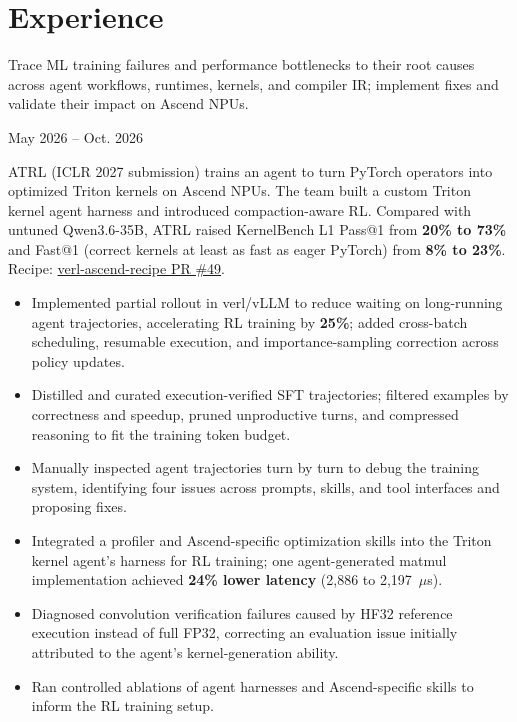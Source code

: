 \documentclass[11pt,a4paper,sans]{moderncv}
\newcommand{\atrlprojectdates}{May 2026 -- Oct. 2026}
\newcommand{\projectheading}[2]{%
  \par\addvspace{2.5pt}\noindent{\small\bfseries #1}\hfill{\small\color{color2}#2}\par\nobreak\vspace{2pt}}
\newenvironment{projectgroup}{%
  \begin{list}{}{\setlength{\leftmargin}{4mm}\setlength{\rightmargin}{0pt}%
    \setlength{\topsep}{0pt}\setlength{\partopsep}{0pt}%
    \setlength{\parsep}{0pt}\setlength{\itemsep}{0pt}}\item[]
}{\end{list}}
\newenvironment{resumeitems}{%
  \begin{itemize}\setlength{\itemsep}{2pt}\setlength{\parsep}{0pt}%
}{\end{itemize}}
\begin{document}
\makecvtitle
\vspace{-1.3cm}

\section{Experience}
Trace ML training failures and performance bottlenecks to their root causes across agent workflows, runtimes, kernels, and compiler IR; implement fixes and validate their impact on Ascend NPUs.

\begin{projectgroup}
\projectheading{Post-Training for a Triton Kernel Agent}{\atrlprojectdates}
ATRL (ICLR 2027 submission) trains an agent to turn PyTorch operators into optimized Triton kernels on Ascend NPUs. The team built a custom Triton kernel agent harness and introduced compaction-aware RL. Compared with untuned Qwen3.6-35B, ATRL raised KernelBench L1 Pass@1 from \textbf{20\% to 73\%} and Fast@1 (correct kernels at least as fast as eager PyTorch) from \textbf{8\% to 23\%}. Recipe: \href{https://github.com/verl-project/verl-ascend-recipe/pull/49}{verl-ascend-recipe PR \#49}.
\begin{resumeitems}
  \item Implemented partial rollout in verl/vLLM to reduce waiting on long-running agent trajectories, accelerating RL training by \textbf{25\%}; added cross-batch scheduling, resumable execution, and importance-sampling correction across policy updates.
  \item Distilled and curated execution-verified SFT trajectories; filtered examples by correctness and speedup, pruned unproductive turns, and compressed reasoning to fit the training token budget.
  \item Manually inspected agent trajectories turn by turn to debug the training system, identifying four issues across prompts, skills, and tool interfaces and proposing fixes.
  \item Integrated a profiler and Ascend-specific optimization skills into the Triton kernel agent's harness for RL training; one agent-generated matmul implementation achieved \textbf{24\% lower latency} (2,886 to 2,197~$\mu$s).
  \item Diagnosed convolution verification failures caused by HF32 reference execution instead of full FP32, correcting an evaluation issue initially attributed to the agent's kernel-generation ability.
  \item Ran controlled ablations of agent harnesses and Ascend-specific skills to inform the RL training setup.
\end{resumeitems}


\end{projectgroup}
\end{document}
